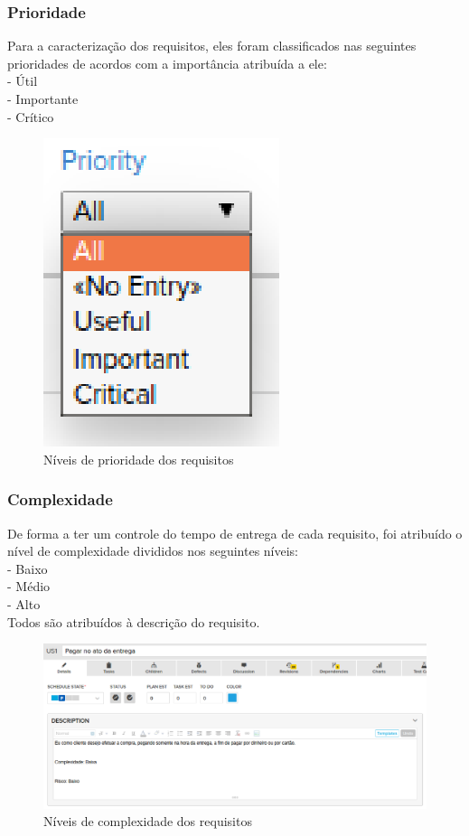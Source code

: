 \subsubsection{Prioridade}

Para a caracterização dos requisitos, eles foram classificados nas seguintes prioridades de acordos com a importância atribuída a ele:\\
\tab - Útil\\
\tab - Importante\\
\tab - Crítico\\

\begin{figure}[h]
    \centering
    \label{fig01}
        \includegraphics[keepaspectratio=true,scale=1]{figuras/RallyDev/prioridade.eps}
    \caption{Níveis de prioridade dos requisitos}
\end{figure}

\subsubsection{Complexidade}

De forma a ter um controle do tempo de entrega de cada requisito, foi atribuído o nível de complexidade divididos nos seguintes níveis:\\
\tab - Baixo\\
\tab - Médio\\
\tab - Alto\\
Todos são atribuídos à descrição do requisito.\\


\begin{figure}[h]
    \centering
    \label{fig01}
        \includegraphics[keepaspectratio=true,scale=0.4]{figuras/RallyDev/risco.eps}
    \caption{Níveis de complexidade dos requisitos}
\end{figure}


